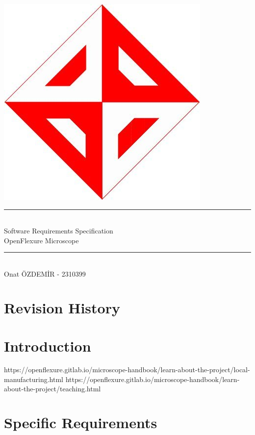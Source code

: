 \documentclass[12pt]{article}
\begin{document}
	\begin{titlepage}
		\newcommand{\HRule}{\rule{\linewidth}{0.1mm}} 
		\center 
		\includegraphics[scale=0.12]{ceng} \\[1cm]
		\HRule \\[0.5cm]
		{ \huge Software Requirements Specification }\\[0.4cm]
		{\Large OpenFlexure Microscope} \\
		
		\HRule \\[2cm]
		
				
		{\large Onat ÖZDEMİR - 2310399} \\

	\end{titlepage}
	
	\begingroup
	\hypersetup{hidelinks}
	\tableofcontents
	\newpage
	\listoffigures
	\newpage
	\listoftables
	\newpage
	\endgroup
	
	
	\section*{Revision History}
	
	\newpage
	
	\section{Introduction}
	

	\begin{thebibliography}{2}
	 https://openflexure.gitlab.io/microscope-handbook/learn-about-the-project/local-manufacturing.html
	https://openflexure.gitlab.io/microscope-handbook/learn-about-the-project/teaching.html
	\end{thebibliography}

	\newpage
	
	\section{Specific Requirements}
	
	
	
	
\end{document}
